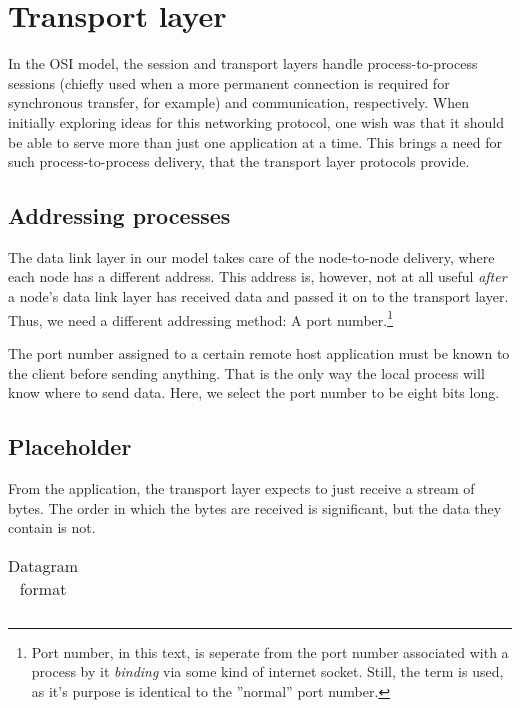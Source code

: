 \section{Transport layer}
In the OSI model, the session and transport layers handle process-to-process sessions (chiefly used when a more permanent connection is required for synchronous transfer, for example) and communication, respectively. When initially exploring ideas for this networking protocol, one wish was that it should be able to serve more than just one application at a time. This brings a need for such process-to-process delivery, that the transport layer protocols provide.

\subsection{Addressing processes}
The data link layer in our model takes care of the node-to-node delivery, where each node has a different address. This address is, however, not at all useful \textit{after} a node's data link layer has received data and passed it on to the transport layer. Thus, we need a different addressing method: A port number.\footnote{Port number, in this text, is seperate from the port number associated with a process by it \textit{binding} via some kind of internet socket. Still, the term is used, as it's purpose is identical to the ''normal'' port number.}

The port number assigned to a certain remote host application must be known to the client before sending anything. That is the only way the local process will know where to send data. Here, we select the port number to be eight bits long.


\subsection{Placeholder}
From the application, the transport layer expects to just receive a stream of bytes. The order in which the bytes are received is significant, but the data they contain is not.


\begin{table}[htb]
 \centering
  \begin{tabular}{c}
   
  \end{tabular}
 \caption{Datagram format}
 \label{tab:DatagramFormat}
\end{table}
%
% 

